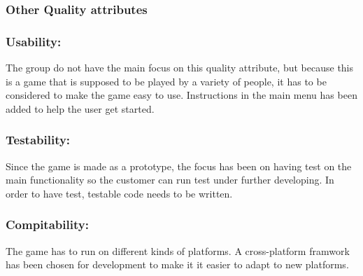 \subsubsection{Other Quality attributes}
\subsubsection*{Usability: } The group do not have the main focus on this quality attribute, but because this is a game that is supposed to be played by a variety of people, it has to be considered to make the game easy to use. Instructions in the main menu has been added to help the user get started.

\subsubsection*{Testability: } Since the game is made as a prototype, the focus has been on having
test on the main functionality so the customer can run test under further developing.
In order to have test, testable code needs to be written.

\subsubsection*{Compitability: } The game has to run on different kinds of platforms. A cross-platform framwork has been chosen for development to make it it easier to adapt to new platforms.
